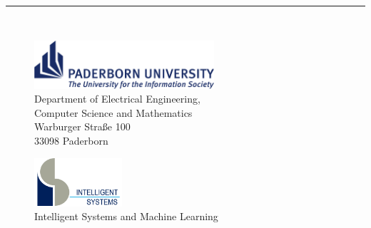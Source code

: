 %
\begin{titlepage}
	\flushright
	\hfill
	\vfill
	{\LARGE\thesisTitle \par}
	\rule[5pt]{\textwidth}{.4pt} \par
	{\Large\thesisName}
	\vfill
	\textit{\large\thesisDate} \\
\end{titlepage}


\begin{titlepage}
	\tgherosfont

	\begin{figure}
		\begin{minipage}[t]{8.5cm}
			\includegraphics[height=1.8cm]{gfx/upb_logo}\\
			\textsf{\small{\hspace*{1.3cm}Department of Electrical Engineering,\\
					\hspace*{1.3cm}Computer Science and Mathematics\\
					\hspace*{1.3cm}Warburger Straße 100 \\
					\hspace*{1.3cm}33098 Paderborn
				}}
		\end{minipage}
		\hfill
		\begin{minipage}[t]{4.7cm}
			\includegraphics[height=1.8cm]{gfx/is-logo-klein}\\
			\textsf{%
				\small{Intelligent Systems and Machine Learning}
			}
		\end{minipage}
	\end{figure}


\end{titlepage}
